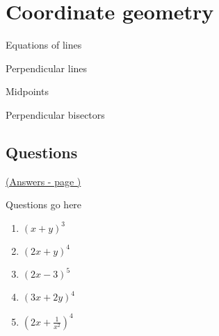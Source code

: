\documentclass[../main.tex]{subfiles}
\begin{document}
\section{Coordinate geometry}

Equations of lines

Perpendicular lines

Midpoints

Perpendicular bisectors


\pagebreak
\hypertarget{coordgeolink}{\subsection*{Questions}}
\hyperlink{coordgeoanswers}{(Answers - page {\pageref*{Coordinate geometry answers}})}

\label{Coord geo}
Questions go here


\begin{enumerate}
    \item \( (x+y)^3 \)
    \item \( (2x+y)^4 \)
    \item \( (2x-3)^5 \)
    \item \( (3x+2y)^4 \)
    \item \( (2x + \frac{1}{x^2 } )^4 \)
\end{enumerate}
\end{document}
